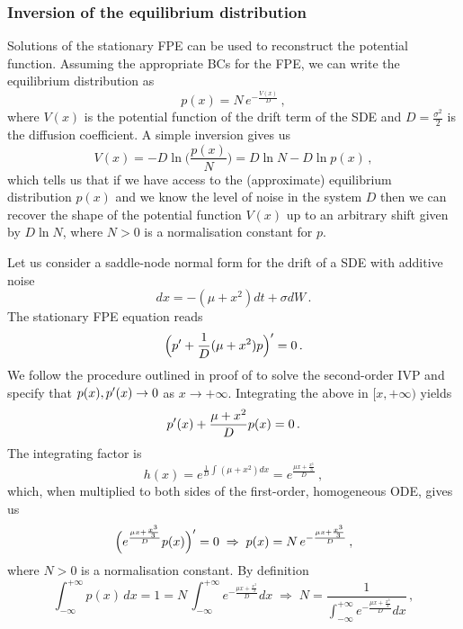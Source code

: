 \documentclass[../main.tex]{subfiles}
\begin{document}
\subsubsection{Inversion of the equilibrium distribution}\label{subsubsec4.2.1}
Solutions of the stationary FPE \cite[Theorem 3.1, p. 3]{StocProc} can be used to reconstruct the potential function.
Assuming the appropriate BCs for the FPE, we can write the equilibrium distribution as
\begin{equation}\label{eq4.2.1.1}
     p(x) = N\,e^{-\frac{V(x)}{D}}\,,
\end{equation}
where $V(x)$ is the potential function of the drift term of the SDE and $D=\frac{\sigma^{2}}{2}$ is the diffusion coefficient.
A simple inversion gives us
\begin{equation}\label{eq4.2.1.2}
     V(x) = -D\ln\bigg(\frac{p(x)}{N}\bigg) = D\ln N - D\ln p(x)\,,
\end{equation}
which tells us that if we have access to the (approximate) equilibrium distribution $p(x)$ and we know the level of noise in the system $D$ then we can recover the shape of the potential function $V(x)$ up to an arbitrary shift given by $D\ln N$, where $N>0$ is a normalisation constant for $p$. 
\begin{example}[label=ex4.2.1.1]{}{}
     Let us consider a saddle-node normal form for the drift of a SDE with additive noise
     \begin{equation*}
          dx = -(\mu+x^{2})dt + \sigma dW\,.
     \end{equation*}
     The stationary FPE equation reads
     \begin{equation*}
          \Big(p'+\frac{1}{D}(\mu+x^{2})p\Big)' = 0\,.
     \end{equation*}
     We follow the procedure outlined in proof of \cite[Theorem 3.2, pp. 4-6]{StocProc} to solve the second-order IVP and specify that $p(x), p'(x)\to0$ as $x\to+\infty$.
     Integrating the above in $[x,+\infty)$ yields
     \begin{equation*}
          p'(x)+\frac{\mu+x^{2}}{D}p(x) = 0\,.
     \end{equation*}
     The integrating factor is 
     \begin{equation*}
          h(x) = e^{\frac{1}{D}\int_{}^{}(\mu+x^{2})dx} = e^{\frac{\mu x + \frac{x^{3}}{3}}{D}}\,,
     \end{equation*}
     which, when multiplied to both sides of the first-order, homogeneous ODE, gives us
     \begin{equation*}
          \Big(e^{\frac{\mu x + \frac{x^{3}}{3}}{D}}p(x)\Big)' = 0\;\Rightarrow\;p(x) = N\,e^{-\frac{\mu x + \frac{x^{3}}{3}}{D}}\,,
     \end{equation*}
     where $N>0$ is a normalisation constant.
     By definition
     \begin{equation*}
          \int_{-\infty}^{+\infty}p(x)\,dx = 1 = N\,\int_{-\infty}^{+\infty}e^{-\frac{\mu x + \frac{x^{3}}{3}}{D}}dx\;\Rightarrow\;N=\frac{1}{\int_{-\infty}^{+\infty}e^{-\frac{\mu x + \frac{x^{3}}{3}}{D}}dx}\,,
     \end{equation*}
\end{example}
\end{document}
